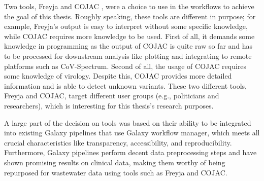     Two tools, Freyja \cite{joshuailevy2022,karthikeyan2022} and COJAC \cite{jahn2021}, were a choice to use in the workflows to achieve the goal of this thesis. Roughly speaking, these tools are different in purpose; for example, Freyja’s output is easy to interpret without some specific knowledge, while COJAC requires more knowledge to be used. First of all, it demands some knowledge in programming as the output of COJAC is quite raw so far and has to be processed for downstream analysis like plotting and integrating to remote platforms such as CoV-Spectrum. Second of all, the usage of COJAC requires some knowledge of virology. Despite this, COJAC provides more detailed information and is able to detect unknown variants. These two different tools, Freyja and COJAC, target different user groups (e.g., politicians and researchers), which is interesting for this thesis's research purposes.
    
    A large part of the decision on tools was based on their ability to be integrated into existing Galaxy pipelines that use Galaxy workflow manager, which meets all crucial characteristics like transparency, accessibility, and reproducibility. Furthermore, Galaxy pipelines perform decent data preprocessing steps and have shown promising results on clinical data, making them worthy of being repurposed for wastewater data using tools such as Freyja and COJAC.